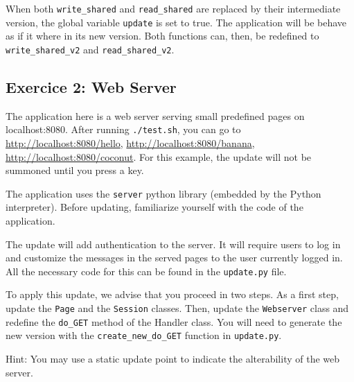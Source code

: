 \documentclass{article}
\begin{document}
When both \texttt{write\_shared} and \texttt{read\_shared} are
replaced by their intermediate version, the global variable
\texttt{update} is set to true. The application will be behave as if
it where in its new version. Both functions can, then, be redefined to
\texttt{write\_shared\_v2} and \texttt{read\_shared\_v2}.


\subsection{Exercice 2: Web Server}

The application here is a web server serving small predefined pages on
localhost:8080. After running \texttt{./test.sh}, you can go to
\url{http://localhost:8080/hello}, \url{http://localhost:8080/banana},
\url{http://localhost:8080/coconut}. For this example, the update will
not be summoned until you press a key.

The application uses the \texttt{server} python library (embedded by
the Python interpreter). Before updating, familiarize yourself with
the code of the application.

The update will add authentication to the server. It will require
users to log in and customize the messages in the served pages to the
user currently logged in. All the necessary code for this can be found
in the \texttt{update.py} file.

To apply this update, we advise that you proceed in two steps. As a
first step, update the \texttt{Page} and the \texttt{Session}
classes. Then, update the \texttt{Webserver} class and redefine the
\texttt{do\_GET} method of the Handler class. You will need to generate
the new version with the \texttt{create\_new\_do\_GET} function in
\texttt{update.py}.

Hint: You may use a static update point to indicate the alterability
of the web server.
\end{document}
